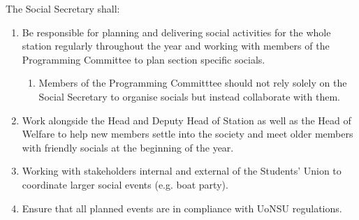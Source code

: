 \item The Social Secretary shall:
\begin{enumerate}[label*=\arabic*.]
    \item Be responsible for planning and delivering social activities for the whole station regularly throughout the year and working with members of the Programming Committee to plan section specific socials.
          \begin{enumerate}[label*=\arabic*.]
              \item Members of the Programming Committtee should not rely solely on the Social Secretary to organise socials but instead collaborate with them.
          \end{enumerate}
    \item Work alongside the Head and Deputy Head of Station as well as the Head of Welfare to help new members settle into the society and meet older members with friendly socials at the beginning of the year.
    \item Working with stakeholders internal and external of the Students' Union to coordinate larger social events (e.g. boat party).
    \item Ensure that all planned events are in compliance with UoNSU regulations.
\end{enumerate}
